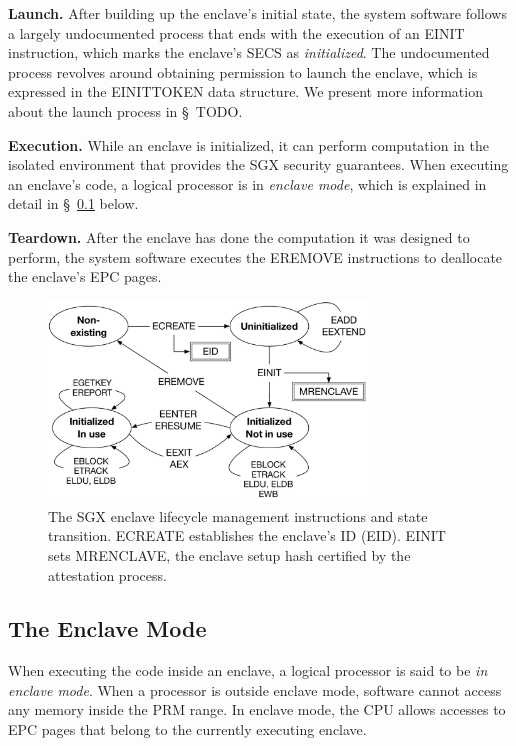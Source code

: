 \textbf{Launch.} After building up the enclave's initial state, the system
software follows a largely undocumented process that ends with the execution of
an EINIT instruction, which marks the enclave's SECS as \textit{initialized}.
The undocumented process revolves around obtaining permission to launch the
enclave, which is expressed in the EINITTOKEN data structure. We present more
information about the launch process in \S~TODO.

\textbf{Execution.} While an enclave is initialized, it can perform computation
in the isolated environment that provides the SGX security guarantees. When
executing an enclave's code, a logical processor is in \textit{enclave mode},
which is explained in detail in \S~\ref{sec:enclave_mode} below.

\textbf{Teardown.} After the enclave has done the computation it was designed
to perform, the system software executes the EREMOVE instructions to deallocate
the enclave's EPC pages.

\begin{figure}[hbt]
  \centering
  \includegraphics[width=85mm]{figures/enclave_lifecycle.pdf}
  \caption{
    The SGX enclave lifecycle management instructions and state transition.
    ECREATE establishes the enclave's ID (EID). EINIT sets MRENCLAVE, the
    enclave setup hash certified by the attestation process.
  }
  \label{fig:enclave_lifecycle}
\end{figure}


\subsection{The Enclave Mode}
\label{sec:enclave_mode}


When executing the code inside an enclave, a logical processor is said to be
\textit{in enclave mode}. When a processor is outside enclave mode, software
cannot access any memory inside the PRM range. In enclave mode, the CPU allows
accesses to EPC pages that belong to the currently executing enclave.

